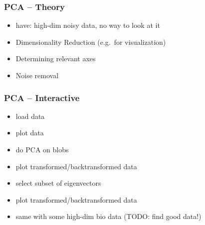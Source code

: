\begin{frame}
    \frametitle{PCA -- Theory}
    \begin{itemize}
        \item  have: high-dim noisy data, no way to look at it
        \item  Dimensionality Reduction (e.g.\ for visualization)
        \item  Determining relevant axes
        \item  Noise removal
    \end{itemize}
\end{frame}

\begin{frame}
    \frametitle{PCA -- Interactive}
    \begin{itemize}
        \item  load data
        \item  plot data
        \item  do PCA on blobs
        \item  plot transformed/backtransformed data
        \item  select subset of eigenvectors
        \item  plot transformed/backtransformed data
        \item  same with some high-dim bio data (TODO: find good data!)
    \end{itemize}
\end{frame}

